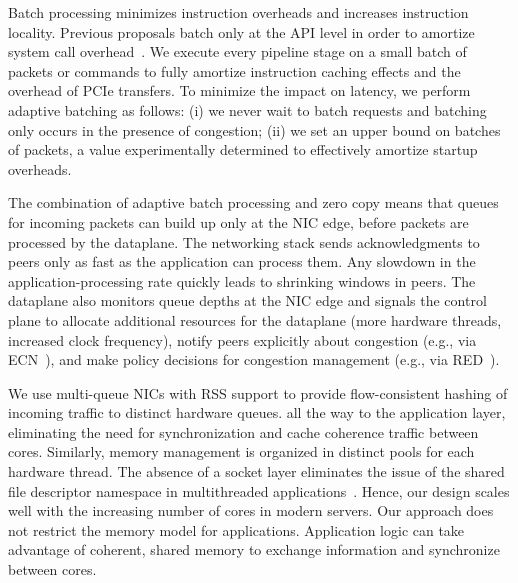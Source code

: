 Batch processing minimizes instruction overheads and increases
instruction locality. Previous proposals batch only at the API level
in order to amortize system call
overhead~\cite{DBLP:conf/osdi/HanMCR12,jeong2014mtcp,DBLP:conf/osdi/SoaresS10}. We
execute every pipeline stage on a small batch of packets or commands
to fully amortize instruction caching effects and the overhead of PCIe
transfers. To minimize the impact on latency, we perform adaptive
batching as follows: (i) we never wait to batch requests and batching
only occurs in the presence of congestion; (ii) we set an upper bound
on batches of  packets, a value experimentally determined to
effectively amortize startup overheads.

The combination of adaptive batch processing and zero copy means that
queues for incoming packets can build up only at the NIC edge, before
packets are processed by the dataplane.  The networking stack sends
acknowledgments to peers only as fast as the application can process
them. Any slowdown in the application-processing rate quickly leads to
shrinking windows in peers. The dataplane also monitors queue depths
at the NIC edge and signals the control plane to allocate additional
resources for the dataplane (more hardware threads, increased clock
frequency), notify peers explicitly about congestion (e.g., via
ECN~\cite{ramakrishnan2001addition}), and make policy decisions for
congestion management (e.g., via
RED~\cite{DBLP:journals/ton/FloydJ93}).




 We use
multi-queue NICs with RSS support to provide flow-consistent hashing
of incoming traffic to distinct hardware queues.  all the way to the application layer,
eliminating the need for synchronization and cache coherence traffic
between cores. Similarly, memory management is organized in distinct
pools for each hardware thread. The absence of a socket layer
eliminates the issue of the shared file descriptor namespace in
multithreaded
applications~\cite{DBLP:conf/sosp/ClementsKZMK13}. Hence, our design
scales well with the increasing number of cores in modern servers. Our
approach does not restrict the memory model for
applications. Application logic can take advantage of coherent, shared
memory to exchange information and synchronize between cores.




